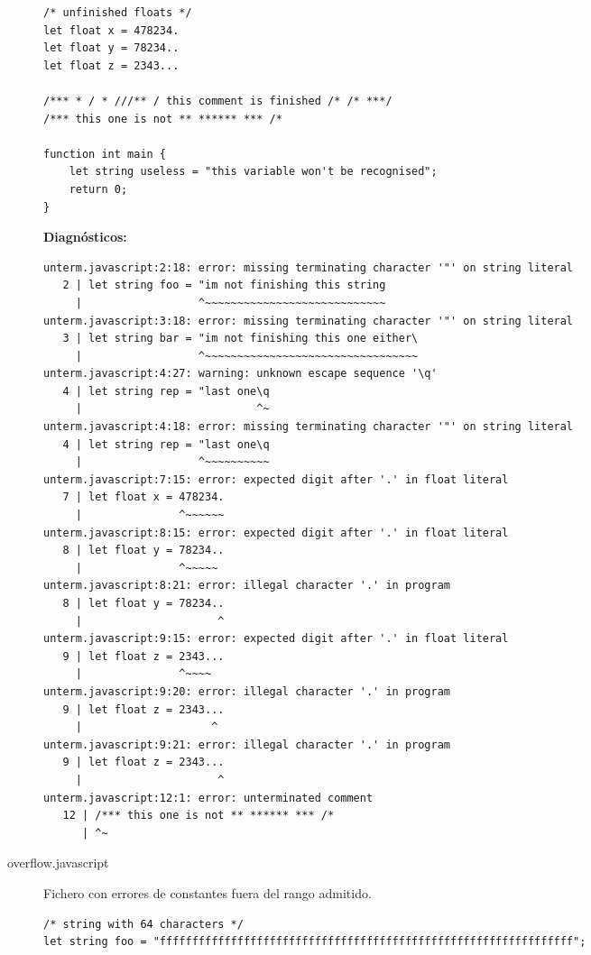 \documentclass[a4paper]{CSMakotoTechnicalReport}
\begin{document}
\begin{appendices}
\begin{description}
\begin{lstlisting}
/* unfinished floats */
let float x = 478234.
let float y = 78234..
let float z = 2343...

/*** * / * ///** / this comment is finished /* /* ***/
/*** this one is not ** ****** *** /*

function int main {
    let string useless = "this variable won't be recognised";
    return 0;
}
            \end{lstlisting}

            \textbf{Diagnósticos:}
            \begin{lstlisting}
unterm.javascript:2:18: error: missing terminating character '"' on string literal
   2 | let string foo = "im not finishing this string
     |                  ^~~~~~~~~~~~~~~~~~~~~~~~~~~~~
unterm.javascript:3:18: error: missing terminating character '"' on string literal
   3 | let string bar = "im not finishing this one either\
     |                  ^~~~~~~~~~~~~~~~~~~~~~~~~~~~~~~~~~
unterm.javascript:4:27: warning: unknown escape sequence '\q'
   4 | let string rep = "last one\q
     |                           ^~
unterm.javascript:4:18: error: missing terminating character '"' on string literal
   4 | let string rep = "last one\q
     |                  ^~~~~~~~~~~
unterm.javascript:7:15: error: expected digit after '.' in float literal
   7 | let float x = 478234.
     |               ^~~~~~~
unterm.javascript:8:15: error: expected digit after '.' in float literal
   8 | let float y = 78234..
     |               ^~~~~~
unterm.javascript:8:21: error: illegal character '.' in program
   8 | let float y = 78234..
     |                     ^
unterm.javascript:9:15: error: expected digit after '.' in float literal
   9 | let float z = 2343...
     |               ^~~~~
unterm.javascript:9:20: error: illegal character '.' in program
   9 | let float z = 2343...
     |                    ^
unterm.javascript:9:21: error: illegal character '.' in program
   9 | let float z = 2343...
     |                     ^
unterm.javascript:12:1: error: unterminated comment
   12 | /*** this one is not ** ****** *** /*
      | ^~
            \end{lstlisting}
            \newpage
        
        \item[overflow.javascript] Fichero con errores de constantes fuera del rango admitido.
            \begin{lstlisting}
/* string with 64 characters */
let string foo = "ffffffffffffffffffffffffffffffffffffffffffffffffffffffffffffffff";


\end{lstlisting}
\end{description}
\end{appendices}
\end{document}
